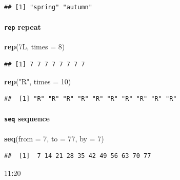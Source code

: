 \documentclass[
]{book}
\newenvironment{Shaded}{\begin{snugshade}}{\end{snugshade}}
\newcommand{\AttributeTok}[1]{\textcolor[rgb]{0.13,0.29,0.53}{#1}}
\newcommand{\DataTypeTok}[1]{\textcolor[rgb]{0.13,0.29,0.53}{#1}}
\newcommand{\DecValTok}[1]{\textcolor[rgb]{0.00,0.00,0.81}{#1}}
\newcommand{\FunctionTok}[1]{\textcolor[rgb]{0.13,0.29,0.53}{\textbf{#1}}}
\newcommand{\NormalTok}[1]{#1}
\newcommand{\SpecialCharTok}[1]{\textcolor[rgb]{0.81,0.36,0.00}{\textbf{#1}}}
\newcommand{\StringTok}[1]{\textcolor[rgb]{0.31,0.60,0.02}{#1}}
\theoremstyle{definition}
\theoremstyle{definition}
\theoremstyle{definition}
\theoremstyle{definition}
\theoremstyle{remark}
\begin{document}
\begin{verbatim}
## [1] "spring" "autumn"
\end{verbatim}

\paragraph{\texorpdfstring{\texttt{rep} repeat}{rep repeat}}\label{rep-repeat}

\begin{Shaded}
\begin{Highlighting}[]
\FunctionTok{rep}\NormalTok{(}\DecValTok{7}\DataTypeTok{L}\NormalTok{, }\AttributeTok{times =} \DecValTok{8}\NormalTok{)}
\end{Highlighting}
\end{Shaded}

\begin{verbatim}
## [1] 7 7 7 7 7 7 7 7
\end{verbatim}

\begin{Shaded}
\begin{Highlighting}[]
\FunctionTok{rep}\NormalTok{(}\StringTok{"R"}\NormalTok{, }\AttributeTok{times =} \DecValTok{10}\NormalTok{)}
\end{Highlighting}
\end{Shaded}

\begin{verbatim}
##  [1] "R" "R" "R" "R" "R" "R" "R" "R" "R" "R"
\end{verbatim}

\paragraph{\texorpdfstring{\texttt{seq} sequence}{seq sequence}}\label{seq-sequence}

\begin{Shaded}
\begin{Highlighting}[]
\FunctionTok{seq}\NormalTok{(}\AttributeTok{from =} \DecValTok{7}\NormalTok{, }\AttributeTok{to =} \DecValTok{77}\NormalTok{, }\AttributeTok{by =} \DecValTok{7}\NormalTok{)}
\end{Highlighting}
\end{Shaded}

\begin{verbatim}
##  [1]  7 14 21 28 35 42 49 56 63 70 77
\end{verbatim}

\begin{Shaded}
\begin{Highlighting}[]
\DecValTok{11}\SpecialCharTok{:}\DecValTok{20}
\end{Highlighting}
\end{Shaded}
\end{document}

